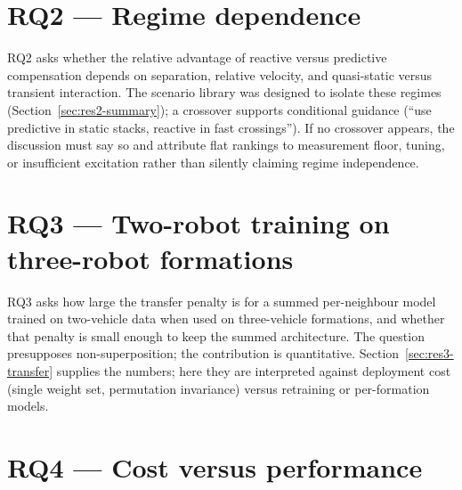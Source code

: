 
\section{RQ2 --- Regime dependence}
\label{sec:disc-rq2}

RQ2 asks whether the relative advantage of reactive versus predictive compensation depends on
separation, relative velocity, and quasi-static versus transient interaction. The scenario library
was designed to isolate these regimes (Section~\ref{sec:res2-summary}); a crossover supports
conditional guidance (``use predictive in static stacks, reactive in fast crossings''). If no crossover
appears, the discussion must say so and attribute flat rankings to measurement floor, tuning, or
insufficient excitation rather than silently claiming regime independence.


\section{RQ3 --- Two-robot training on three-robot formations}
\label{sec:disc-rq3}

RQ3 asks how large the transfer penalty is for a summed per-neighbour model trained on two-vehicle
data when used on three-vehicle formations, and whether that penalty is small enough to keep the
summed architecture. The question presupposes non-superposition; the contribution is quantitative.
Section~\ref{sec:res3-transfer} supplies the numbers; here they are interpreted against deployment
cost (single weight set, permutation invariance) versus retraining or per-formation models.


\section{RQ4 --- Cost versus performance}
\label{sec:disc-rq4}


